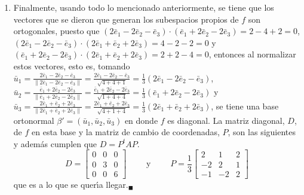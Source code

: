 \begin{solucion}
\begin{enumerate}[$a$)]
  \item Finalmente, usando todo lo mencionado anteriormente, se tiene que los vectores que se dieron que generan los subespacios propios de $f$ son ortogonales, puesto que $\left( 2\bar{e}_1 - 2\bar{e}_2 - \bar{e}_3 \right) \cdot \left( \bar{e}_1 + 2\bar{e}_2 - 2\bar{e}_3 \right) = 2-4+2 = 0$, $\left( 2\bar{e}_1 - 2\bar{e}_2 - \bar{e}_3 \right) \cdot \left( 2\bar{e}_1 + \bar{e}_2 +2\bar{e}_3 \right) = 4 - 2 - 2 = 0$ y $\left( \bar{e}_1 + 2\bar{e}_2 - 2\bar{e}_3 \right) \cdot \left( 2\bar{e}_1 + \bar{e}_2 +2\bar{e}_3 \right) = 2 + 2 - 4 = 0$, entonces al normalizar estos vectores, esto es, tomando $\bar{u}_1 = \frac{2\bar{e}_1 - 2\bar{e}_2 - \bar{e}_3}{\left\lVert 2\bar{e}_1 - 2\bar{e}_2 - \bar{e}_3 \right\rVert} = \frac{2\bar{e}_1 - 2\bar{e}_2 - \bar{e}_3}{\sqrt{4+4+1}} = \frac{1}{3}\left(2\bar{e}_1 - 2\bar{e}_2 - \bar{e}_3 \right)$,
  $\bar{u}_2 = \frac{\bar{e}_1 + 2\bar{e}_2 - 2\bar{e}_3}{\left\lVert \bar{e}_1 + 2\bar{e}_2 - 2\bar{e}_3 \right\rVert} = \frac{\bar{e}_1 + 2\bar{e}_2 - 2\bar{e}_3}{\sqrt{1+4+4}} = \frac{1}{3}\left(\bar{e}_1 + 2\bar{e}_2 - 2\bar{e}_3 \right)$
  y $\bar{u}_3 = \frac{2\bar{e}_1 + \bar{e}_2 +2\bar{e}_3}{\left\lVert 2\bar{e}_1 + \bar{e}_2 +2\bar{e}_3 \right\rVert} = \frac{2\bar{e}_1 + \bar{e}_2 +2\bar{e}_3}{\sqrt{4 + 1+ 4}} = \frac{1}{3} \left( 2\bar{e}_1 + \bar{e}_2 +2\bar{e}_3 \right)$, se tiene una base ortonormal $\beta' = \left( \bar{u}_1, \bar{u}_2, \bar{u}_3 \right)$ en donde $f$ es diagonal. La matriz diagonal, $D$, de $f$ en esta base y la matriz de cambio de coordenadas, $P$, son las siguientes y adem\'as cumplen que $D = P^tAP$.
  \begin{equation*}
   D = 
   \begin{bmatrix}
    0 & 0 & 0 \\
    0 & 3 & 0 \\
    0 & 0 & 6
   \end{bmatrix}
   \qquad \text{ y } \qquad
   P = \frac{1}{3}
   \begin{bmatrix}
     2 &  1 & 2 \\
    -2 &  2 & 1 \\
    -1 & -2 & 2
   \end{bmatrix}
  \end{equation*}
  que es a lo que se quer\'{\i}a llegar.${}_{\blacksquare}$
 \end{enumerate}
\end{solucion}
